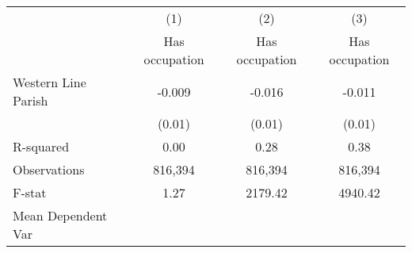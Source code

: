 {
\def\sym#1{\ifmmode^{#1}\else\(^{#1}\)\fi}
\begin{tabular}{l*{3}{c}}
\hline\hline
                    &\multicolumn{1}{c}{(1)}&\multicolumn{1}{c}{(2)}&\multicolumn{1}{c}{(3)}\\
                    &\multicolumn{1}{c}{Has occupation}&\multicolumn{1}{c}{Has occupation}&\multicolumn{1}{c}{Has occupation}\\
\hline
Western Line Parish &      -0.009         &      -0.016         &      -0.011         \\
                    &      (0.01)         &      (0.01)         &      (0.01)         \\
\hline
R-squared           &        0.00         &        0.28         &        0.38         \\
Observations        &     816,394         &     816,394         &     816,394         \\
F-stat              &        1.27         &     2179.42         &     4940.42         \\
Mean Dependent Var  &                     &                     &                     \\
\hline\hline
\end{tabular}
}
